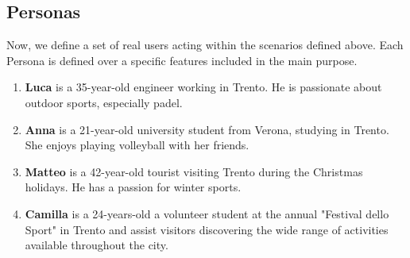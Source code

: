 \subsection{Personas}
Now, we define a set of real users acting within the scenarios defined above. Each Persona is defined over a specific features included in the main purpose.
\begin{enumerate}
    \item \textbf{Luca} is a 35-year-old engineer working in Trento. He is passionate about outdoor sports, especially padel.
    \item \textbf{Anna} is a 21-year-old university student from Verona, studying in Trento. She enjoys playing volleyball with her friends.
    \item \textbf{Matteo} is a 42-year-old tourist visiting Trento during the Christmas holidays. He has a passion for winter sports.
    \item \textbf{Camilla} is a 24-years-old a volunteer student at the annual "Festival dello Sport" in Trento and assist visitors discovering the wide range of activities available throughout the city. 
\end{enumerate}

